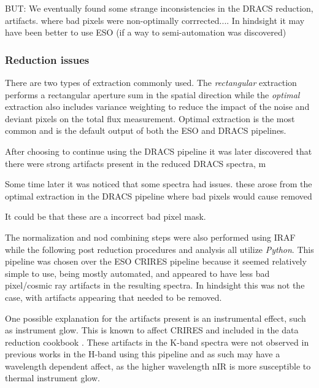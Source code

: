 BUT: We eventually found some strange inconsistencies in the DRACS reduction, artifacts. where bad pixels were non-optimally corrrected....
In hindsight it may have been better to use ESO (if a way to semi-automation was discovered)



\subsubsection{Reduction issues}

There are two types of extraction commonly used. The \emph{rectangular} extraction performs a rectangular aperture sum in the spatial direction while the \emph{optimal} extraction \citep{horne_optimal_1986} also includes variance weighting to reduce the impact of the noise and deviant pixels on the total flux measurement. Optimal extraction is the most common and is the default output of both the ESO and DRACS pipelines.

After choosing to continue using the DRACS pipeline it was later discovered that there were strong artifacts present in the reduced DRACS spectra, m

Some time later it was noticed that some spectra had issues. these arose from the optimal extraction in the DRACS pipeline where bad pixels would cause removed


It could be that these are a incorrect bad pixel mask.

The normalization and nod combining steps were also performed using IRAF while the following post reduction procedures and analysis all utilize \emph{Python}. This pipeline was chosen over the ESO CRIRES pipeline because it seemed relatively simple to use, being mostly automated, and appeared to have less bad pixel/cosmic ray artifacts in the resulting spectra. In hindsight this was not the case, with artifacts appearing that needed to be removed. 

One possible explanation for the artifacts present is an instrumental effect, such as instrument glow. This is known to affect CRIRES and included in the data reduction cookbook \citep{smoker_very_2012}. These artifacts in the K-band spectra were not observed in previous works in the H-band using this pipeline and as such may have a wavelength dependent affect, as the higher wavelength nIR is more susceptible to thermal instrument glow.



